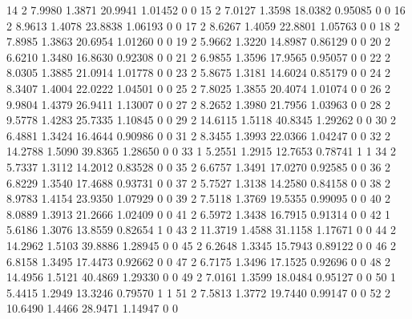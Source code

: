 \documentclass[12pt]{article}
\begin{document}
\begin{Schunk}
\begin{Soutput}
14             2  7.9980 1.3871 20.9941 1.01452         0         0
15             2  7.0127 1.3598 18.0382 0.95085         0         0
16             2  8.9613 1.4078 23.8838 1.06193         0         0
17             2  8.6267 1.4059 22.8801 1.05763         0         0
18             2  7.8985 1.3863 20.6954 1.01260         0         0
19             2  5.9662 1.3220 14.8987 0.86129         0         0
20             2  6.6210 1.3480 16.8630 0.92308         0         0
21             2  6.9855 1.3596 17.9565 0.95057         0         0
22             2  8.0305 1.3885 21.0914 1.01778         0         0
23             2  5.8675 1.3181 14.6024 0.85179         0         0
24             2  8.3407 1.4004 22.0222 1.04501         0         0
25             2  7.8025 1.3855 20.4074 1.01074         0         0
26             2  9.9804 1.4379 26.9411 1.13007         0         0
27             2  8.2652 1.3980 21.7956 1.03963         0         0
28             2  9.5778 1.4283 25.7335 1.10845         0         0
29             2 14.6115 1.5118 40.8345 1.29262         0         0
30             2  6.4881 1.3424 16.4644 0.90986         0         0
31             2  8.3455 1.3993 22.0366 1.04247         0         0
32             2 14.2788 1.5090 39.8365 1.28650         0         0
33             1  5.2551 1.2915 12.7653 0.78741         1         1
34             2  5.7337 1.3112 14.2012 0.83528         0         0
35             2  6.6757 1.3491 17.0270 0.92585         0         0
36             2  6.8229 1.3540 17.4688 0.93731         0         0
37             2  5.7527 1.3138 14.2580 0.84158         0         0
38             2  8.9783 1.4154 23.9350 1.07929         0         0
39             2  7.5118 1.3769 19.5355 0.99095         0         0
40             2  8.0889 1.3913 21.2666 1.02409         0         0
41             2  6.5972 1.3438 16.7915 0.91314         0         0
42             1  5.6186 1.3076 13.8559 0.82654         1         0
43             2 11.3719 1.4588 31.1158 1.17671         0         0
44             2 14.2962 1.5103 39.8886 1.28945         0         0
45             2  6.2648 1.3345 15.7943 0.89122         0         0
46             2  6.8158 1.3495 17.4473 0.92662         0         0
47             2  6.7175 1.3496 17.1525 0.92696         0         0
48             2 14.4956 1.5121 40.4869 1.29330         0         0
49             2  7.0161 1.3599 18.0484 0.95127         0         0
50             1  5.4415 1.2949 13.3246 0.79570         1         1
51             2  7.5813 1.3772 19.7440 0.99147         0         0
52             2 10.6490 1.4466 28.9471 1.14947         0         0

\end{Soutput}
\end{Schunk}
\end{document}
